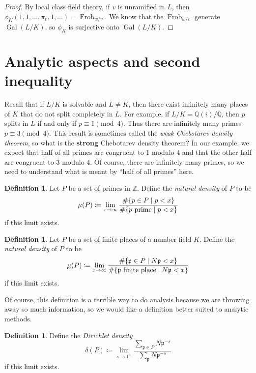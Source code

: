 \documentclass[leqno, openany]{memoir}
\theoremstyle{definition}
\newtheorem{defn}[thm]{Definition}
\theoremstyle{remark}
\theoremstyle{plain}
\theoremstyle{definition}
\theoremstyle{remark}
\newcommand{\Z}{\mathbb{Z}}
\newcommand{\Q}{\mathbb{Q}}
\newcommand{\mf}[1]{\mathfrak{#1}}
\DeclareMathOperator{\Gal}{Gal}
\DeclareMathOperator{\Frob}{Frob}
\begin{document}
\begin{proof} By local class field theory, if $v$ is unramified in $L$, then
$\phi_K (1, 1, \ldots, \pi_v, 1, \ldots) = \Frob_{w/v}$. We know that the
$\Frob_{w/v}$ generate $\Gal(L/K)$, so $\phi_K$ is surjective onto $\Gal(L/K)$.
\end{proof}

\section{Analytic aspects and second inequality}%
\label{sec:analytic_aspects_and_second_inequality}

Recall that if $L/K$ is solvable and $L \neq K$, then there exist infinitely
many places of $K$ that do not split completely in $L$. For example, if $L/K =
\Q(i)/\Q$, then $p$ splits in $L$ if and only if $p \equiv 1 \pmod{4}$. Thus
there are infinitely many primes $p \equiv 3 \pmod{4}$. This result is
sometimes called the \textit{weak Chebotarev density theorem}, so what is the
\textbf{strong} Chebotarev density theorem? In our example, we expect that half
of all primes are congruent to $1$ modulo $4$ and that the other half are
congruent to $3$ modulo $4$. Of course, there are infinitely many primes, so we
need to understand what is meant by ``half of all primes'' here.

\begin{defn} Let $P$ be a set of primes in $\Z$. Define the \textit{natural
    density} of $P$ to be \[ \mu(P) \coloneqq \lim_{x \to \infty} \frac{\#
\qty{p \in P \mid p < x}}{\# \qty{p\ \text{prime} \mid p < x}} \] if this limit
exists.  \end{defn}

\begin{defn} Let $P$ be a set of finite places of a number field $K$. Define
    the \textit{natural density} of $P$ to be \[ \mu(P) \coloneqq \lim_{x \to
    \infty} \frac{\# \qty{\mf{p} \in P \mid N \mf{p} < x}}{\# \qty{\mf{p}\
    \text{finite place} \mid N \mf{p} < x}} \] if this limit exists.
\end{defn}

Of course, this definition is a terrible way to do analysis because we are
throwing away so much information, so we would like a definition better suited
to analytic methods.

\begin{defn} Define the \textit{Dirichlet density} \[ \delta(P) \coloneqq
\lim_{s \to 1^+} \frac{\sum_{\mf{p} \in P}N\mf{p}^{-s}}{\sum_{\mf{p}}
N\mf{p}^{-s}} \] if this limit exists.  \end{defn}
\end{document}
